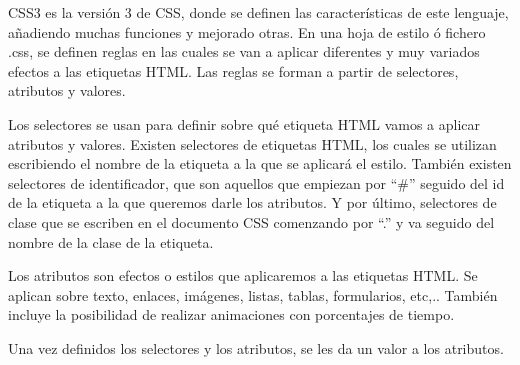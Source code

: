 \documentclass[a4paper, 12pt]{book}
\begin{document}
CSS3 es la versi\'on 3 de CSS, donde se definen las caracter\'isticas de este lenguaje, a\~nadiendo muchas funciones y mejorado otras.
En una hoja de estilo \'o fichero .css, se definen reglas en las cuales se van a aplicar diferentes y muy variados efectos a las etiquetas HTML.
Las reglas se forman a partir de selectores, atributos y valores. 

Los selectores se usan para definir sobre qu\'e etiqueta HTML vamos a aplicar atributos y valores. Existen selectores de etiquetas HTML, los cuales 
se utilizan escribiendo el nombre de la etiqueta a la que se aplicar\'a el estilo. Tambi\'en existen selectores de identificador, que son aquellos que 
empiezan por ``\#'' seguido del id de la etiqueta a la que queremos darle los atributos. Y por \'ultimo, selectores de clase que se escriben en el 
documento CSS comenzando por ``.'' y va seguido del nombre de la clase de la etiqueta.

Los atributos son efectos o estilos que aplicaremos a las etiquetas HTML. Se aplican sobre texto, enlaces, im\'agenes, listas, tablas, formularios, 
etc,.. Tambi\'en incluye la posibilidad de realizar animaciones con porcentajes de tiempo.

Una vez definidos los selectores y los atributos, se les da un valor a los atributos. 
\end{document}
